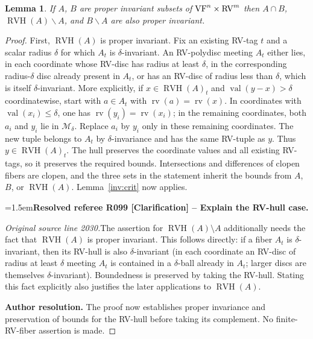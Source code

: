 \documentclass[12pt]{amsart}
\newcommand{\ResolvedRefereeRemark}[5]{%
  \par\medskip\begingroup\normalfont\small\color{gray}%
  \emergencystretch=1.5em\noindent\textbf{Resolved referee R#1 [#2] -- #3.}\par\nobreak\noindent #4\par
  \medskip\color{ResolutionGreen}\noindent\textbf{Author resolution.} #5\par
  \endgroup\medskip
}
\theoremstyle{plain}
\newtheorem{lem}[thm]{Lemma}
\theoremstyle{definition}
\theoremstyle{remark}
\numberwithin{equation}{section}
\theoremstyle{plain}
\newcommand{\VF}{\textup{VF}}
\newcommand{\RV}{\textup{RV}}
\newcommand{\MM}{\mdl M}
\newcommand{\0}{\emptyset}
\newcommand{\mdl}[1]{\mathcal{#1}}  %
\newcommand{\mi}{\smallsetminus}
\DeclareMathOperator{\rv}{rv}
\DeclareMathOperator{\vv}{val}
\DeclareMathOperator{\RVH}{RVH}
\begin{document}
\begin{lem}\label{int:inv}
If $A$, $B$ are proper invariant subsets of $\VF^n \times \RV^m$ then $A \cap B$, $\RVH(A) \mi A$, and $B \mi A$ are also proper invariant.
\end{lem}
\begin{proof}
First, $\RVH(A)$ is proper invariant. Fix an existing RV-tag $t$ and a scalar radius $\delta$ for which $A_t$ is $\delta$-invariant. An RV-polydisc meeting $A_t$ either lies, in each coordinate whose RV-disc has radius at least $\delta$, in the corresponding radius-$\delta$ disc already present in $A_t$, or has an RV-disc of radius less than $\delta$, which is itself $\delta$-invariant. More explicitly, if $x\in\RVH(A)_t$ and $\vv(y-x)>\delta$ coordinatewise, start with $a\in A_t$ with $\rv(a)=\rv(x)$. In coordinates with $\vv(x_i)\leq\delta$, one has $\rv(y_i)=\rv(x_i)$; in the remaining coordinates, both $a_i$ and $y_i$ lie in $\MM_\delta$. Replace $a_i$ by $y_i$ only in these remaining coordinates. The new tuple belongs to $A_t$ by $\delta$-invariance and has the same RV-tuple as $y$. Thus $y\in\RVH(A)_t$. The hull preserves the coordinate values and all existing RV-tags, so it preserves the required bounds. Intersections and differences of clopen fibers are clopen, and the three sets in the statement inherit the bounds from $A$, $B$, or $\RVH(A)$. Lemma~\ref{inv:crit} now applies.

\ResolvedRefereeRemark{099}{Clarification}{Explain the RV-hull case}{%
\textit{Original source line 2030.}\quad The assertion for $\RVH(A)\setminus A$ additionally needs the fact that $\RVH(A)$ is proper invariant. This follows directly: if a fiber $A_t$ is $\delta$-invariant, then its RV-hull is also $\delta$-invariant (in each coordinate an RV-disc of radius at least $\delta$ meeting $A_t$ is contained in a $\delta$-ball already in $A_t$; larger discs are themselves $\delta$-invariant). Boundedness is preserved by taking the RV-hull. Stating this fact explicitly also justifies the later applications to $\RVH(A)$.
}{The proof now establishes proper invariance and preservation of bounds for the RV-hull before taking its complement. No finite-RV-fiber assertion is made.}
\end{proof}
\end{document}
